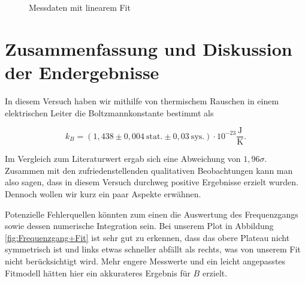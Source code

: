 \documentclass{article}
\begin{document}
\begin{figure}[!h]
    \centering
    \caption{Messdaten mit linearem Fit}
    \label{fig:Messdaten+Fit}
\end{figure}

\clearpage
\newpage
\section{Zusammenfassung und Diskussion der Endergebnisse}

In diesem Versuch haben wir mithilfe von thermischem Rauschen in einem elektrischen Leiter die Boltzmannkonstante bestimmt als 

\begin{equation}
    k_B = (1,438 \pm 0,004 \ \text{stat.} \pm 0,03 \ \text{sys.}) \cdot 10^{-23} \frac{\text{J}}{\text{K}}.
\end{equation}

Im Vergleich zum Literaturwert ergab sich eine Abweichung von $1,96 \sigma$. Zusammen mit den zufriedenstellenden qualitativen Beobachtungen kann man also sagen, dass in diesem Versuch durchweg positive Ergebnisse erzielt wurden. Dennoch wollen wir kurz ein paar Aspekte erwähnen.

Potenzielle Fehlerquellen könnten zum einen die Auswertung des Frequenzgangs sowie dessen numerische Integration sein. Bei unserem Plot in Abbildung \ref{fig:Frequenzgang+Fit} ist sehr gut zu erkennen, dass das obere Plateau nicht symmetrisch ist und links etwas schneller abfällt als rechts, was von unserem Fit nicht berücksichtigt wird. Mehr engere Messwerte und ein leicht angepasstes Fitmodell hätten hier ein akkurateres Ergebnis für $B$ erzielt.  
\end{document}
